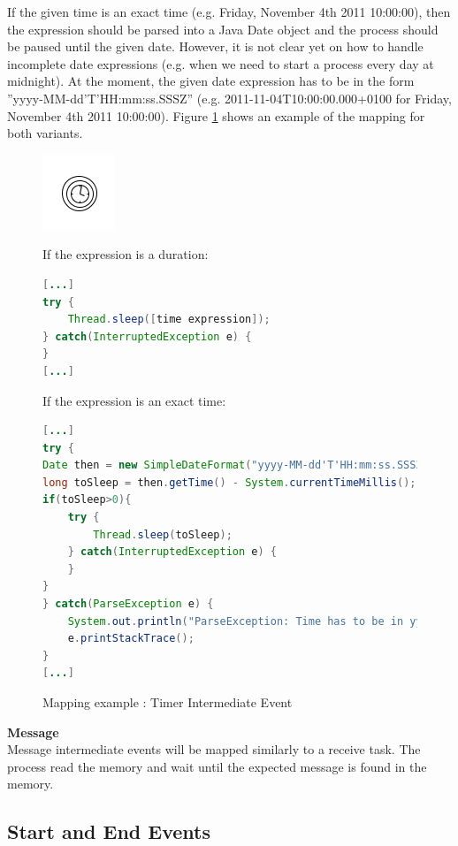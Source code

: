 If the given time is an exact time (e.g. Friday, November 4th 2011 10:00:00), then the expression should be parsed into a Java Date object and the process should be paused until the given date. However, it is not clear yet on how to handle incomplete date expressions (e.g. when we need to start a process every day at midnight). At the moment, the given date expression has to be in the form ''yyyy-MM-dd'T'HH:mm:ss.SSSZ'' (e.g. 2011-11-04T10:00:00.000+0100 for Friday, November 4th 2011 10:00:00). Figure \ref{fig:timer_intermediate}
shows an example of the mapping for both variants.
\begin{figure}[h]
\begin{minipage}[c]{0.28\textwidth}
\includegraphics{images/mapping/timer_intermediate.png}
\end{minipage}
\begin{minipage}[c]{0.72\textwidth}
If the expression is a duration:
\begin{lstlisting}[language = Java]
[...]
try {
	Thread.sleep([time expression]);
} catch(InterruptedException e) {
}
[...]
\end{lstlisting}
If the expression is an exact time:
\begin{lstlisting}[language = Java]
[...]
try {
Date then = new SimpleDateFormat("yyyy-MM-dd'T'HH:mm:ss.SSSZ").parse([time expression]);
long toSleep = then.getTime() - System.currentTimeMillis();
if(toSleep>0){
	try {
		Thread.sleep(toSleep);
	} catch(InterruptedException e) {
	}
}
} catch(ParseException e) {
	System.out.println("ParseException: Time has to be in yyyy-MM-dd'T'HH:mm:ss.SSSZ form");
	e.printStackTrace();
}
[...]
\end{lstlisting}
\end{minipage}
\caption{Mapping example : Timer Intermediate Event}%
\label{fig:timer_intermediate}%
\end{figure}
\newpage
\textbf{Message}\\
Message intermediate events will be mapped similarly to a receive task. The process read the memory and wait until the expected message is found in the memory. 

\subsection{Start and End Events}

